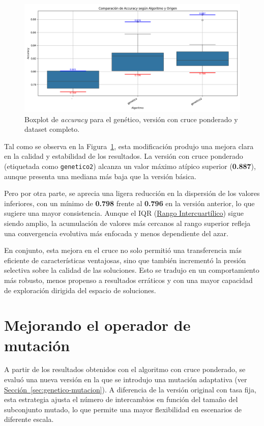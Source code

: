 \begin{figure}[htp]
    \centering
    \includegraphics[width=1\textwidth]{imagenes/evaluaciones/operador-de-cruce}
    \caption{Boxplot de \textit{accuracy} para el genético, versión con cruce ponderado y dataset completo.}
    \label{fig:cruce_ponderado}
\end{figure}

Tal como se observa en la Figura~\ref{fig:cruce_ponderado}, esta modificación produjo una mejora clara en la calidad y estabilidad de los resultados.
La versión con cruce ponderado (etiquetada como \texttt{genetico2}) alcanza un valor máximo atípico superior (\textbf{0.887}),
aunque presenta una mediana más baja que la versión básica.

Pero por otra parte, se aprecia una ligera reducción en la dispersión de los valores inferiores,
con un mínimo de \textbf{0.798} frente al \textbf{0.796} en la versión anterior, lo que sugiere una mayor consistencia.
Aunque el IQR (\hyperref[subsec:visualizacion-de-resultados]{Rango Intercuartílico}) sigue siendo amplio,
la acumulación de valores más cercanos al rango superior refleja una convergencia evolutiva más enfocada y menos dependiente del azar.

En conjunto, esta mejora en el cruce no solo permitió una transferencia más eficiente de características ventajosas,
sino que también incrementó la presión selectiva sobre la calidad de las soluciones.
Esto se tradujo en un comportamiento más robusto, menos propenso a resultados erráticos y con una mayor capacidad de exploración dirigida del espacio de soluciones.


\section{Mejorando el operador de mutación}\label{sec:mejorando-mutacion}
A partir de los resultados obtenidos con el algoritmo con cruce ponderado, se evaluó una nueva versión en la que se introdujo una mutación adaptativa
(ver \hyperref[sec:genetico-mutacion]{Sección~\ref*{sec:genetico-mutacion}}).
A diferencia de la versión original con tasa fija, esta estrategia ajusta el número de intercambios en función del tamaño del subconjunto mutado,
lo que permite una mayor flexibilidad en escenarios de diferente escala.

